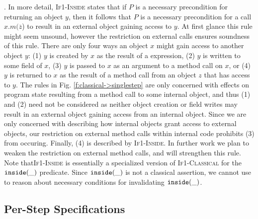  
.
In more detail,  \textsc{If1-Inside} states that if $P$ is
a necessary precondition for returning an object $y$, then 
it follows that $P$ is a necessary precondition for a call $x.m(\overline{z}$) to 
result in an external object gaining access to $y$.
At first glance this rule might seem unsound, however the restriction on 
external calls ensures soundness of this rule.
There are only four ways
an object $x$ might gain access to another object $y$: 
(1) $y$ is created by $x$ as the result of a  expression, 
(2) $y$ is written to some field of $x$, 
(3) $y$ is passed to $x$ as an argument to a method call on $x$,
or (4) $y$ is returned to $x$ as the result of a method call from an object $z$ that has access to $y$.
The rules in Fig. \ref{f:classical->singlestep} are only concerned with 
effects on program state resulting from a method call to some internal object, and thus (1) and (2) need not be considered as 
neither object creation or field writes may result in an external object gaining access from an internal object.
Since we are only concerned with describing how internal objects grant access to external objects,
our restriction on external method calls within internal code prohibits (3) from occuring. Finally,
(4) is described by \textsc{If1-Inside}.
In further work we plan to weaken the restriction on external method calls, and will  
strengthen this rule.
Note that\textsc{If1-Inside}  is essentially  a specialized version of \textsc{If1-Classical}
for the $\texttt{inside}( \_ )$ predicate. Since $\texttt{inside}( \_ )$ is not a classical
assertion, we cannot use \funcSpecs to reason about necessary conditions
for invalidating $\texttt{inside}( \_ )$.
 
 
 

\subsection{Per-Step \Nec Specifications}
\label{s:module-proof}

